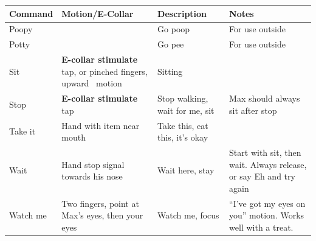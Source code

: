 \documentclass[pdftex,12pt]{article}
\begin{document}
\begin{table}[H]\label{tab:commands}
\begin{adjustwidth}{-4.5cm}{-4.5cm}
\begin{center}
\bgroup%
\def\arraystretch{1.3} %
\begin{tabular}{lp{}p{}p{}}
\rowcolor{gray!50} Command    & Motion/E-Collar                                                  & Description                                           & Notes                                                                \\
\bottomrule
\rowcolor{white} Poopy      &                                                                  & Go poop                                               & For use outside                                                      \\
\rowcolor{gray!25}   Potty      &                                                                  & Go pee                                                & For use outside                                                      \\
\rowcolor{white} Sit        & \textbf{E-collar stimulate} tap, or pinched fingers, upward \break~motion & Sitting                                               &                                                                      \\
\rowcolor{gray!25}   Stop       & \textbf{E-collar stimulate} tap                                           & Stop walking, wait for me, sit                        & Max should always sit after stop                                     \\
\rowcolor{white} Take it    & Hand with item near mouth                                        & Take this, eat this, it's okay                        &                                                                      \\
\rowcolor{gray!25}   Wait       & Hand stop signal towards his nose                                & Wait here, stay                                       & Start with sit, then wait. Always release, or say Eh and try again   \\
\rowcolor{white} Watch me   & Two fingers, point at Max's eyes, then your eyes                 & Watch me, focus                                       & ``I've got my eyes on you'' motion. Works well with a treat.         \\
\end{tabular}
\egroup%
\end{center}
\end{adjustwidth}
\end{table}
\end{document}
